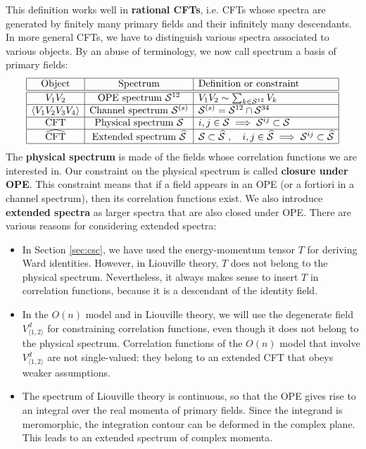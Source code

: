\documentclass[12pt, a4paper]{article}
\newcommand{\myindex}[1]{\textbf{\boldmath #1}}
\begin{document}
This definition works well in \myindex{rational CFTs}, i.e. CFTs whose spectra are generated by finitely many primary fields and their infinitely many descendants.
In more general CFTs, we have to distinguish various spectra associated to various objects. By an abuse of terminology, we now call spectrum a basis of primary fields:
\begin{align}
 \begin{array}{|c|c|l|}
  \hline 
  \text{Object} & \text{Spectrum}  & \text{Definition or constraint}
  \\
  \hline \hline 
  V_1V_2 & \text{OPE spectrum } \mathcal{S}^{12} & V_1V_2 \sim \sum_{k\in \mathcal{S}^{12}} V_k 
  \\
  \hline 
  \left<V_1V_2V_3V_4\right> & \text{Channel spectrum } \mathcal{S}^{(s)} &  \mathcal{S}^{(s)}= \mathcal{S}^{12}\cap \mathcal{S}^{34}
  \\
  \hline 
  \text{CFT} & \text{Physical spectrum } \mathcal{S} &  i,j\in\mathcal{S}\implies \mathcal{S}^{ij}\subset \mathcal{S}  
  \\
  \hline 
  \widehat{\text{CFT}} & \text{Extended spectrum } \widehat{\mathcal{S}} & \mathcal{S}\subset \widehat{\mathcal{S}}\ , \quad i,j\in\widehat{\mathcal{S}}\implies \mathcal{S}^{ij}\subset \widehat{\mathcal{S}}
  \\
  \hline 
 \end{array}
 \label{specs}
\end{align}
The \myindex{physical spectrum} is made of the fields whose correlation functions we are interested in. Our constraint on the physical spectrum is called \myindex{closure under OPE}. This constraint means that if a field appears in an OPE (or a fortiori in a channel spectrum), then its correlation functions exist.
We also introduce \myindex{extended spectra} as larger spectra that are also closed under OPE. There are various reasons for considering extended spectra:
\begin{itemize}
 \item In Section \ref{sec:csc}, we have used the energy-momentum tensor $T$ for deriving Ward identities. However, in Liouville theory, $T$ does not belong to the physical spectrum. Nevertheless, it always makes sense to insert $T$ in correlation functions, because it is a descendant of the identity field. 
 \item In the $O(n)$ model and in Liouville theory, we will use the degenerate field $V^d_{\langle 1,2\rangle}$ for constraining correlation functions, even though it does not belong to the physical spectrum. Correlation functions of the $O(n)$ model that involve $V^d_{\langle 1,2\rangle}$ are not single-valued: they belong to an extended CFT that obeys weaker assumptions. 
 \item The spectrum of Liouville theory is continuous, so that the OPE gives rise to an integral over the real momenta of primary fields. Since the integrand is meromorphic, the integration contour can be deformed in the complex plane. This leads to an extended spectrum of complex momenta.
\end{itemize}
\end{document}
